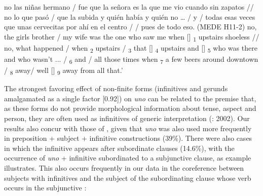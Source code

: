 \documentclass[output=paper]{langscibook}
\begin{document}
\eanoraggedright\label{ex:orozco:12}
\begin{xlist}[‘E:]
 {{no las niñas hermano / fue que la señora es la que me vio cuando}  {sin zapatos // no lo que pasó /}  {que}  {la subida y}  {quién había y quién no …}  /    {y / todas esas veces que}  {unas cervecitas por ahí en el centro /}  {/ pues}  {de todo eso.} (MEDE H11{}-2)}
\glt  no, the girls brother / my wife was the one who saw me when [] \textsubscript{1} upstairs shoeless // no, what happened / when  \textsubscript{2} upstairs /  \textsubscript{3} that [] \textsubscript{4} upstairs and []  \textsubscript{5} who was there and who wasn’t ...  /   \textsubscript{6} and / all those times when  \textsubscript{7} a few beers around downtown /  \textsubscript{8} away/ well []  \textsubscript{9} away from all that.’ 
\end{xlist}
\z 

The strongest favoring effect of non-finite forms (infinitives and gerunds amalgamated as a single factor [0.92]) on \textit{uno} can be related to the premise that, as these forms do not provide morphological information about tense, aspect and person, they are often used as infinitives of generic interpretation (\citealt{NuevaGramática2009}: 2002). Our results also concur with those of , given that \textit{uno} was also used more frequently in preposition + subject + infinitive constructions (39\%). There were also cases in which the infinitive appears after subordinate clauses (14.6\%), with the occurrence of \textit{uno} + infinitive subordinated to a subjunctive clause, as example  illustrates. This also occurs frequently in our data in the coreference between subjects with infinitives and the subject of the subordinating clause whose verb occurs in the subjunctive :
\end{document}
